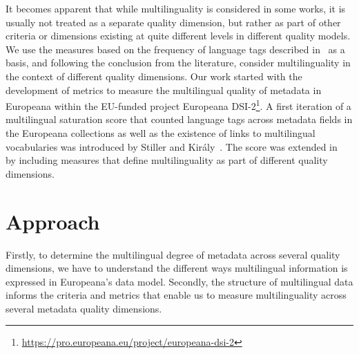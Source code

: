It becomes apparent that while multilinguality is considered in some works, it is usually not treated as a separate quality dimension, but rather as part of other criteria or dimensions existing at quite different levels in different quality models. %
We use the measures based on the frequency of language tags described in~\cite{vogias2013} as a basis, and following the conclusion from the literature, consider multilinguality in the context of different quality dimensions. Our work started with the development of metrics to measure the multilingual quality of metadata in Europeana within the EU-funded project Europeana DSI-2\footnote{\url{https://pro.europeana.eu/project/europeana-dsi-2}}. 
A first iteration of a multilingual saturation score that counted language tags across metadata fields in the Europeana collections as well as the existence of links to multilingual vocabularies was introduced by Stiller and Király~\cite{stiller-kiraly2017}. The score was extended in~\cite{charles2017} by including measures that define multilinguality as part of different quality dimensions. 
\section{Approach}
Firstly, to determine the multilingual degree of metadata across several quality dimensions, we have to understand the different ways multilingual information is expressed in Europeana's data model. Secondly, the structure of multilingual data informs the criteria and metrics that enable us to measure multilinguality across several metadata quality dimensions.

